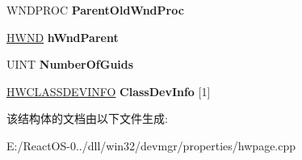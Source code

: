 \begin{DoxyCompactItemize}
\item 
\mbox{\label{struct___h_a_r_d_w_a_r_e___p_a_g_e___d_a_t_a_a299daa17511b49643478bc025cc7c925}} 
W\+N\+D\+P\+R\+OC {\bfseries Parent\+Old\+Wnd\+Proc}
\item 
\mbox{\label{struct___h_a_r_d_w_a_r_e___p_a_g_e___d_a_t_a_a6660efc80ed373a190ee4a5449996253}} 
\hyperlink{interfacevoid}{H\+W\+ND} {\bfseries h\+Wnd\+Parent}
\item 
\mbox{\label{struct___h_a_r_d_w_a_r_e___p_a_g_e___d_a_t_a_aae7491249495017ecb06c1f41ad3b9d5}} 
U\+I\+NT {\bfseries Number\+Of\+Guids}
\item 
\mbox{\label{struct___h_a_r_d_w_a_r_e___p_a_g_e___d_a_t_a_ad8206c36b3d3a17b9c321e79821bf091}} 
\hyperlink{struct___h_w_c_l_a_s_s_d_e_v_i_n_f_o}{H\+W\+C\+L\+A\+S\+S\+D\+E\+V\+I\+N\+FO} {\bfseries Class\+Dev\+Info} \mbox{[}1\mbox{]}
\end{DoxyCompactItemize}


该结构体的文档由以下文件生成\+:\begin{DoxyCompactItemize}
\item 
E\+:/\+React\+O\+S-\/0../dll/win32/devmgr/properties/hwpage.\+cpp\end{DoxyCompactItemize}
